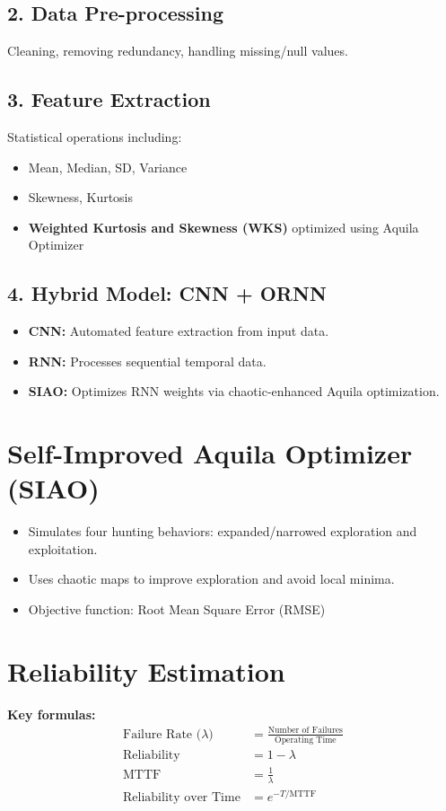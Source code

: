 \documentclass[12pt]{article}
\begin{document}
\subsection*{2. Data Pre-processing}
Cleaning, removing redundancy, handling missing/null values.

\subsection*{3. Feature Extraction}
Statistical operations including:
\begin{itemize}
    \item Mean, Median, SD, Variance
    \item Skewness, Kurtosis
    \item \textbf{Weighted Kurtosis and Skewness (WKS)} optimized using Aquila Optimizer
\end{itemize}

\subsection*{4. Hybrid Model: CNN + ORNN}
\begin{itemize}
    \item \textbf{CNN:} Automated feature extraction from input data.
    \item \textbf{RNN:} Processes sequential temporal data.
    \item \textbf{SIAO:} Optimizes RNN weights via chaotic-enhanced Aquila optimization.
\end{itemize}

\section*{Self-Improved Aquila Optimizer (SIAO)}
\begin{itemize}
    \item Simulates four hunting behaviors: expanded/narrowed exploration and exploitation.
    \item Uses chaotic maps to improve exploration and avoid local minima.
    \item Objective function: Root Mean Square Error (RMSE)
\end{itemize}

\section*{Reliability Estimation}
\textbf{Key formulas:}
\begin{align*}
\text{Failure Rate (}\lambda\text{)} &= \frac{\text{Number of Failures}}{\text{Operating Time}} \\
\text{Reliability} &= 1 - \lambda \\
\text{MTTF} &= \frac{1}{\lambda} \\
\text{Reliability over Time} &= e^{-T/\text{MTTF}}
\end{align*}
\end{document}
